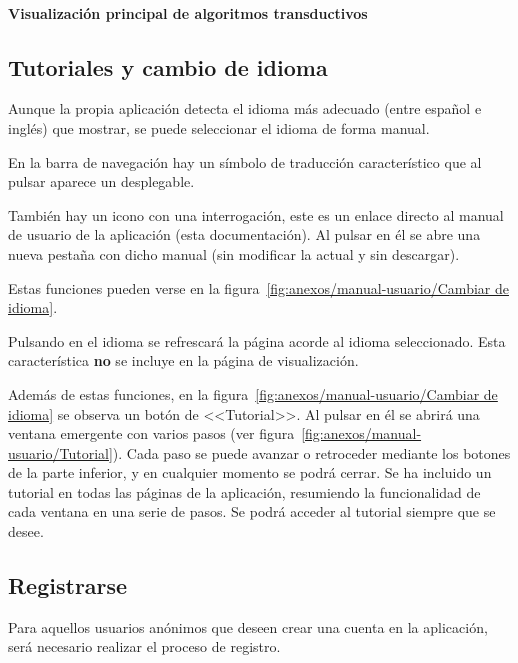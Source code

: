 \paragraph{Visualización principal de algoritmos transductivos} %

\subsection{Tutoriales y cambio de idioma}

Aunque la propia aplicación detecta el idioma más adecuado (entre español e
inglés) que mostrar, se puede seleccionar el idioma de forma manual.

En la barra de navegación hay un símbolo de traducción característico que al
pulsar aparece un desplegable.

También hay un icono con una interrogación, este es un enlace directo al manual
de usuario de la aplicación (esta documentación). Al pulsar en él se abre una
nueva pestaña con dicho manual (sin modificar la actual y sin descargar).

Estas funciones pueden verse en la figura~\ref{fig:anexos/manual-usuario/Cambiar
de idioma}.


Pulsando en el idioma se refrescará la página acorde al idioma seleccionado.
Esta característica \textbf{no} se incluye en la página de visualización.

Además de estas funciones, en la figura~\ref{fig:anexos/manual-usuario/Cambiar de idioma} se observa un botón de <<Tutorial>>. Al pulsar en él se abrirá una ventana emergente con varios pasos (ver figura~\ref{fig:anexos/manual-usuario/Tutorial}). Cada paso se puede avanzar o retroceder mediante los botones de la parte inferior, y en cualquier momento se podrá cerrar.
Se ha incluido un tutorial en todas las páginas de la aplicación, resumiendo la funcionalidad de cada ventana en una serie de pasos. Se podrá acceder al tutorial siempre que se desee.


\subsection{Registrarse}

Para aquellos usuarios anónimos que deseen crear una cuenta en la aplicación,
será necesario realizar el proceso de registro.

